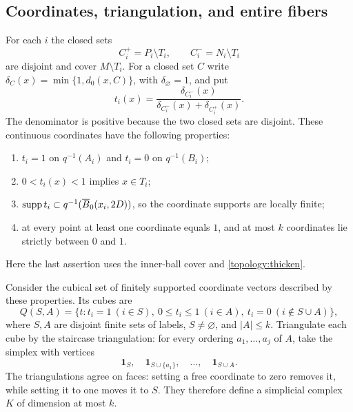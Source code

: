 \subsection{Coordinates, triangulation, and entire fibers}

For each $i$ the closed sets
\[
 C_i^+=P_i\setminus T_i,\qquad C_i^-=N_i\setminus T_i
\]
are disjoint and cover $M\setminus T_i$.  For a closed set $C$ write
$\delta_C(x)=\min\{1,d_0(x,C)\}$, with $\delta_\varnothing=1$, and put
\begin{equation}\label{topology:coordinates}
 t_i(x)=\frac{\delta_{C_i^-}(x)}
                    {\delta_{C_i^-}(x)+\delta_{C_i^+}(x)}.
\end{equation}
The denominator is positive because the two closed sets are disjoint.
These continuous coordinates have the following properties:
\begin{enumerate}[label=(\roman*)]
 \item $t_i=1$ on $q^{-1}(A_i)$ and $t_i=0$ on $q^{-1}(B_i)$;
 \item $0<t_i(x)<1$ implies $x\in T_i$;
 \item $\operatorname{supp} t_i\subset q^{-1}(\overline B_0(x_i,2D))$,
       so the coordinate supports are locally finite;
 \item at every point at least one coordinate equals $1$, and at most
       $k$ coordinates lie strictly between $0$ and $1$.
\end{enumerate}
Here the last assertion uses the inner-ball cover and
\cref{topology:thicken}.

Consider the cubical set of finitely supported coordinate vectors
described by these properties.  Its cubes are
\[
 Q(S,A)=\{t:t_i=1\ (i\in S),\ 0\le t_i\le1\ (i\in A),
                    \ t_i=0\ (i\notin S\cup A)\},
\]
where $S,A$ are disjoint finite sets of labels, $S\ne\varnothing$, and
$|A|\le k$.  Triangulate each cube by the staircase triangulation: for
every ordering $a_1,\ldots,a_j$ of $A$, take the simplex with vertices
\begin{equation}\label{topology:staircase}
 \mathbf1_S,\quad \mathbf1_{S\cup\{a_1\}},\quad\ldots,\quad
 \mathbf1_{S\cup A}.
\end{equation}
The triangulations agree on faces: setting a free coordinate to zero
removes it, while setting it to one moves it to $S$.  They therefore
define a simplicial complex $K$ of dimension at most $k$.

